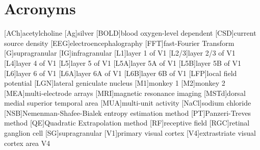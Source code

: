     \chapter*{Acronyms}
    \begin{acronym}[BOLD]
        [ACh]{acetylcholine}
        [Ag]{silver}
        [BOLD]{blood oxygen-level dependent}
        [CSD]{current source density}
        [EEG]{electroencephalography}
        [FFT]{fast-Fourier Transform}
        [G]{supragranular}
        [IG]{infragranular}
        [L1]{layer 1 of \ac{V1}}
        [L2/3]{layer 2/3 of \ac{V1}}
        [L4]{layer 4 of \ac{V1}}
        [L5]{layer 5 of \ac{V1}}
        [L5A]{layer 5A of \ac{V1}}
        [L5B]{layer 5B of \ac{V1}}
        [L6]{layer 6 of \ac{V1}}
        [L6A]{layer 6A of \ac{V1}}
        [L6B]{layer 6B of \ac{V1}}
        [LFP]{local field potential}
        [LGN]{lateral geniculate nucleus}
        [M1]{monkey 1}
        [M2]{monkey 2}
        [MEA]{multi-electrode arrays}
        [MRI]{magnetic resonance imaging}
        [MSTd]{dorsal medial superior temporal area}
        [MUA]{multi-unit activity}
        [NaCl]{sodium chloride}
        [NSB]{{N}emenman-{S}hafee-{B}ialek entropy estimation method}
        [PT]{{P}anzeri-{T}reves method}
        [QE]{Quadratic Extrapolation method}
        [RF]{receptive field}
        [RGC]{retinal ganglion cell}
        [SG]{supragranular}
        [V1]{primary visual cortex}
        [V4]{extrastriate visual cortex area {V4}}
    \end{acronym}                     
\endgroup

\cleardoublepage
